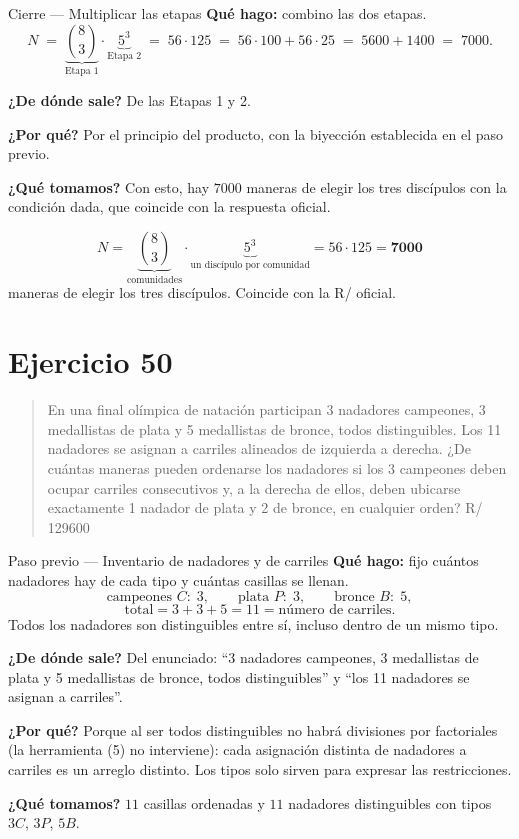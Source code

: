\documentclass[11pt]{article}
\begin{document}
\begin{paso}{Cierre --- Multiplicar las etapas}
\textbf{Qu\'e hago:} combino las dos etapas.
\[
N\;=\;\underbrace{\binom{8}{3}}_{\text{Etapa 1}}\cdot\underbrace{5^3}_{\text{Etapa 2}}
\;=\;56\cdot 125\;=\;56\cdot 100+56\cdot 25\;=\;5600+1400\;=\;7000 .
\]

\textbf{¿De d\'onde sale?} De las Etapas 1 y 2.

\textbf{¿Por qu\'e?} Por el principio del producto, con la biyecci\'on establecida en el paso previo.

\textbf{¿Qu\'e tomamos?} Con esto, hay $7000$ maneras de elegir los tres disc\'ipulos con la condici\'on
dada, que coincide con la respuesta oficial.
\end{paso}

\begin{resp}
\[
N=\underbrace{\binom{8}{3}}_{\text{comunidades}}\cdot\underbrace{5^3}_{\text{un disc\'ipulo por comunidad}}=56\cdot 125=\mathbf{7000}
\]
maneras de elegir los tres disc\'ipulos. Coincide con la R/ oficial.
\end{resp}

\section*{Ejercicio 50}

\begin{quote}
En una final ol\'impica de nataci\'on participan 3 nadadores campeones, 3 medallistas de plata y 5
medallistas de bronce, todos distinguibles. Los 11 nadadores se asignan a carriles alineados de izquierda a
derecha. ¿De cu\'antas maneras pueden ordenarse los nadadores si los 3 campeones deben ocupar carriles
consecutivos y, a la derecha de ellos, deben ubicarse exactamente 1 nadador de plata y 2 de bronce, en
cualquier orden? \hfill R/ 129600
\end{quote}

\begin{paso}{Paso previo --- Inventario de nadadores y de carriles}
\textbf{Qu\'e hago:} fijo cu\'antos nadadores hay de cada tipo y cu\'antas casillas se llenan.
\[
\text{campeones }C:\;3,\qquad \text{plata }P:\;3,\qquad \text{bronce }B:\;5,
\]
\[
\text{total}=3+3+5=11=\text{n\'umero de carriles}.
\]
Todos los nadadores son distinguibles entre s\'i, incluso dentro de un mismo tipo.

\textbf{¿De d\'onde sale?} Del enunciado: ``3 nadadores campeones, 3 medallistas de plata y 5 medallistas de
bronce, todos distinguibles'' y ``los 11 nadadores se asignan a carriles''.

\textbf{¿Por qu\'e?} Porque al ser todos distinguibles no habr\'a divisiones por factoriales
(la herramienta (5) no interviene): cada asignaci\'on distinta de nadadores a carriles es un arreglo
distinto. Los tipos solo sirven para expresar las restricciones.

\textbf{¿Qu\'e tomamos?} $11$ casillas ordenadas y $11$ nadadores distinguibles con tipos $3C$, $3P$, $5B$.
\end{paso}
\end{document}
